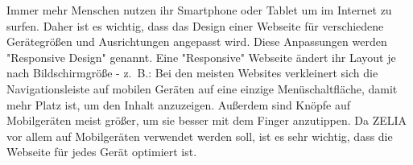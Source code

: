 
Immer mehr Menschen nutzen ihr Smartphone oder Tablet um im Internet zu surfen. Daher ist es wichtig, dass das Design einer Webseite für verschiedene Gerätegrößen und Ausrichtungen angepasst wird. Diese Anpassungen werden "Responsive Design" genannt. Eine "Responsive" Webseite ändert ihr Layout je nach Bildschirmgröße - \mbox{z. B.:} Bei den meisten Websites verkleinert sich die Navigationsleiste auf mobilen Geräten auf eine einzige Menüschaltfläche, damit mehr Platz ist, um den Inhalt anzuzeigen. Außerdem sind Knöpfe auf Mobilgeräten meist größer, um sie besser mit dem Finger anzutippen. Da ZELIA vor allem auf Mobilgeräten verwendet werden soll, ist es sehr wichtig, dass die Webseite für jedes Gerät optimiert ist. 

